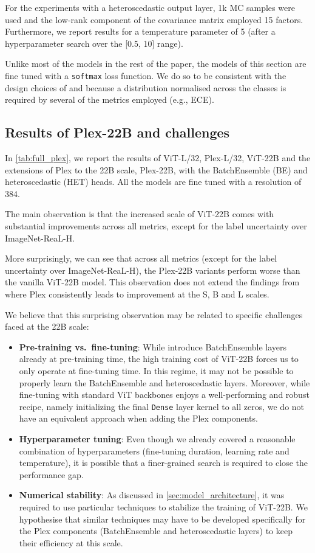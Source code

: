 For the experiments with a heteroscedastic output layer, 1k MC samples were used and the low-rank component of the covariance matrix employed 15 factors. Furthermore, we report results for a temperature parameter of 5 (after a hyperparameter search over the [0.5, 10] range).

Unlike most of the models in the rest of the paper, the models of this section are fine tuned with a \texttt{softmax} loss function. We do so to be consistent with the design choices of \citet{tran2022plex} and because a distribution normalised across the classes is required by several of the metrics employed (e.g., ECE). 

\subsection{Results of Plex-22B and challenges}

In \cref{tab:full_plex}, we report the results of ViT-L/32, Plex-L/32, ViT-22B and the extensions of Plex to the 22B scale, Plex-22B, with the BatchEnsemble (BE) and heteroscedastic (HET) heads. All the models are fine tuned with a resolution of 384. 

The main observation is that the increased scale of ViT-22B comes with substantial improvements across all metrics, except for the label uncertainty over ImageNet-ReaL-H.

More surprisingly, we can see that across all metrics (except for the label uncertainty over ImageNet-ReaL-H), the Plex-22B variants perform worse than the vanilla ViT-22B model. This observation does not extend the findings from \citet{tran2022plex} where Plex consistently leads to improvement at the S, B and L scales.

We believe that this surprising observation may be related to specific challenges faced at the 22B scale:
\begin{itemize}
    \item \textbf{Pre-training vs.~fine-tuning}: While \citet{tran2022plex} introduce BatchEnsemble layers already at pre-training time, the high training cost of ViT-22B forces us to only operate at fine-tuning time. In this regime, it may not be possible to properly learn the BatchEnsemble and heteroscedastic layers. 
    Moreover, while fine-tuning with standard ViT backbones enjoys a well-performing and robust recipe, namely  initializing the final \texttt{Dense} layer kernel to all zeros, we do not have an equivalent approach when adding the Plex components. 
    \item \textbf{Hyperparameter tuning}: Even though we already covered a reasonable combination of hyperparameters (fine-tuning duration, learning rate and temperature), it is possible that a finer-grained search is required to close the performance gap.
    \item \textbf{Numerical stability}: As discussed in \cref{sec:model_architecture}, it was required to use particular techniques to stabilize the training of ViT-22B. We hypothesise that similar techniques may have to be developed specifically for the Plex components (BatchEnsemble and heteroscedastic layers) to keep their efficiency at this scale.
\end{itemize}


